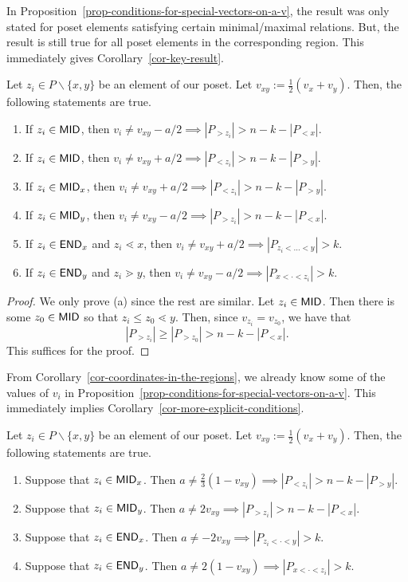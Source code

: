 \documentclass{puthesis-UG}
\begin{document}
In Proposition~\ref{prop-conditions-for-special-vectors-on-a-v}, the result was only stated for poset elements satisfying certain minimal/maximal relations. But, the result is still true for all poset elements in the corresponding region. This immediately gives Corollary~\ref{cor-key-result}. 

\begin{cor} \label{cor-key-result}
	Let $z_i \in P \backslash \{x, y\}$ be an element of our poset. Let $v_{xy} := \frac{1}{2} (v_x + v_y)$. Then, the following statements are true. 
	\begin{enumerate}[label = (\alph*)]
		\item If $z_i \in \mathsf{MID}$, then $v_i \neq v_{xy} - a/2 \implies |P_{> z_i}| > n-k - |P_{< x}|$. 
		\item If $z_i \in \mathsf{MID}$, then $v_i \neq v_{xy} + a/2 \implies |P_{< z_i}| > n-k-|P_{>y}|$. 
		\item If $z_i \in \mathsf{MID}_x$, then $v_i \neq v_{xy} + a/2 \implies |P_{<z_i}| > n-k-|P_{>y}|$.
		\item If $z_i \in \mathsf{MID}_y$, then $v_i \neq v_{xy} - a/2 \implies |P_{> z_i}| > n-k - |P_{< x}|$. 
		\item If $z_i \in \mathsf{END}_x$ and $z_i \lessdot x$, then $v_i \neq v_{xy} + a/2 \implies |P_{z_i < \ldots < y}| > k$. 
		\item If $z_i \in \mathsf{END}_y$ and $z_i \gtrdot y$, then $v_i \neq v_{xy} - a/2 \implies |P_{x < \cdot < z_i}| > k$.  
	\end{enumerate}
\end{cor}

\begin{proof}
	We only prove (a) since the rest are similar. Let $z_i \in \mathsf{MID}$. Then there is some $z_0 \in \mathsf{MID}$ so that $z_i \leq z_0 \lessdot y$. Then, since $v_{z_i} = v_{z_0}$, we have that 
	\[
		|P_{>z_i}| \geq |P_{>z_0}| > n- k - |P_{< x}|.
	\]
	This suffices for the proof. 
\end{proof}


From Corollary~\ref{cor-coordinates-in-the-regions}, we already know some of the values of $v_i$ in Proposition~\ref{prop-conditions-for-special-vectors-on-a-v}. This immediately implies Corollary~\ref{cor-more-explicit-conditions}. 

\begin{cor} \label{cor-more-explicit-conditions}
	Let $z_i \in P \backslash \{x, y\}$ be an element of our poset. Let $v_{xy} := \frac{1}{2} (v_x + v_y)$. Then, the following statements are true. 
	\begin{enumerate}[label = (\alph*)]
		\item Suppose that $z_i \in \mathsf{MID}_x$. Then $a \neq \frac{2}{3} (1 - v_{xy}) \implies |P_{<z_i}| > n-k-|P_{>y}|$. 
		\item Suppose that $z_i \in \mathsf{MID}_y$. Then $a \neq 2v_{xy} \implies |P_{>z_i}| > n-k-|P_{< x}|$. 
		\item Suppose that $z_i \in \mathsf{END}_x$. Then $a \neq -2v_{xy} \implies |P_{z_i < \cdot < y}| > k$. 
		\item Suppose that $z_i \in \mathsf{END}_y$. Then $a \neq 2 (1 - v_{xy}) \implies |P_{x < \cdot < z_i}| > k$. 
	\end{enumerate}
\end{cor}
\end{document}
